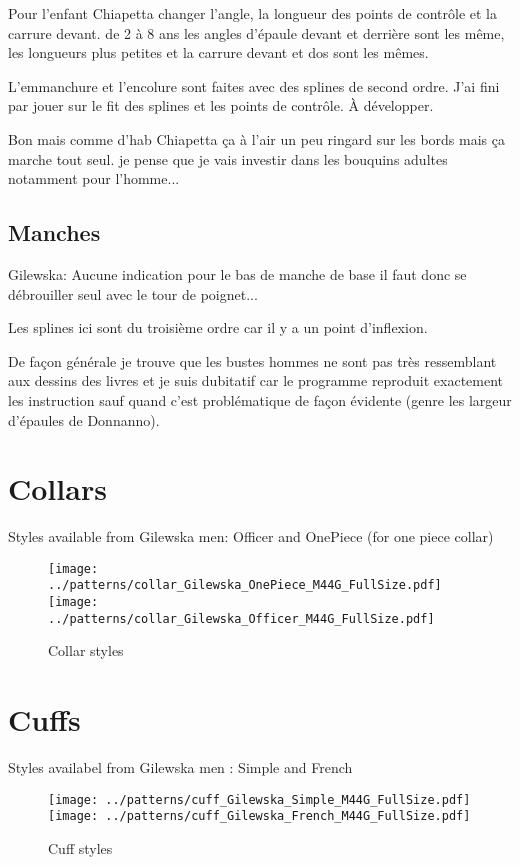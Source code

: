 \documentclass[11pt,a4paper]{report}
\begin{document}
Pour l'enfant Chiapetta changer l'angle, la longueur des points de contrôle et la carrure devant. de 2 à 8 ans les angles d'épaule devant et derrière sont les même, les longueurs plus petites et la carrure devant et dos sont les mêmes.

L'emmanchure et l'encolure sont faites avec des splines de second ordre. J'ai fini par jouer sur le fit des splines et les points de contrôle. À développer.

Bon mais comme d'hab Chiapetta ça à l'air un peu ringard sur les bords mais ça marche tout seul. je pense que je vais investir dans
les bouquins adultes notamment pour l'homme...


\subsection{Manches}
Gilewska: Aucune indication pour le bas de manche de base il faut donc
se débrouiller seul avec le tour de poignet...

Les splines ici sont du troisième ordre car il y a un point d'inflexion.


De façon générale je trouve que les bustes hommes ne sont pas très ressemblant aux dessins des livres et je suis dubitatif car le programme reproduit exactement les instruction sauf quand c'est problématique de façon évidente (genre les largeur d'épaules de Donnanno).


\section{Collars}
Styles available from Gilewska men: Officer and OnePiece (for one piece collar)

\begin{figure}
\begin{center}
\texttt{[image: ../patterns/collar\_Gilewska\_OnePiece\_M44G\_FullSize.pdf]}
\texttt{[image: ../patterns/collar\_Gilewska\_Officer\_M44G\_FullSize.pdf]}
\end{center}
\caption{Collar styles}
\end{figure}


\section{Cuffs}
Styles availabel from Gilewska men : Simple and French

\begin{figure}
\begin{center}
\texttt{[image: ../patterns/cuff\_Gilewska\_Simple\_M44G\_FullSize.pdf]}
\texttt{[image: ../patterns/cuff\_Gilewska\_French\_M44G\_FullSize.pdf]}
\end{center}
\caption{Cuff styles}
\end{figure}
\end{document}
